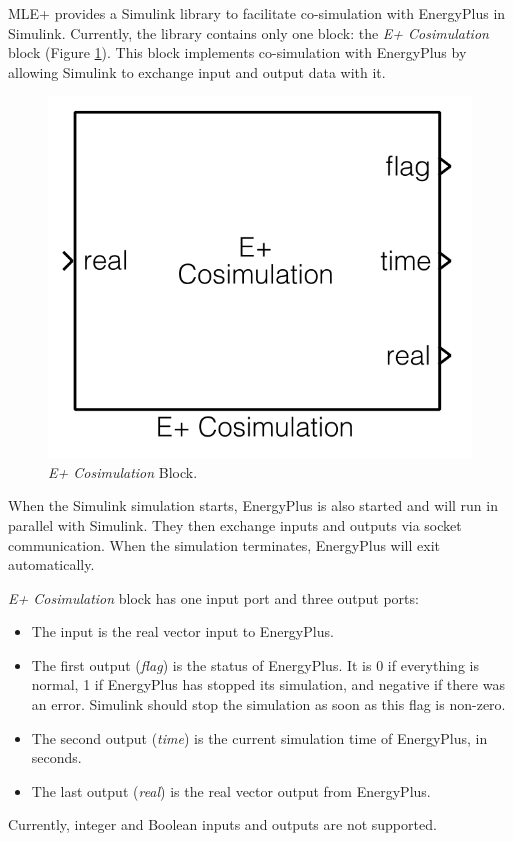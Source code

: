 \documentclass[11pt,letter]{article}
\newcommand{\MLEP}{MLE+\xspace}
\begin{document}
\MLEP provides a Simulink library to facilitate co-simulation with
EnergyPlus in Simulink.  Currently, the library contains only one block:
the \emph{E+ Cosimulation} block (Figure \ref{fig:epblock}).  This
block implements co-simulation with EnergyPlus by allowing Simulink to
exchange input and output data with it.
\begin{figure}[tb]
\centering
\includegraphics[width=.3\linewidth]{graphics/epblock.png}
\caption{\label{fig:epblock}\emph{E+ Cosimulation} Block.}
\end{figure}
When the Simulink simulation starts, EnergyPlus is also started and will run in
parallel with Simulink.  They then exchange inputs and outputs via socket
communication.  When the simulation terminates, EnergyPlus will exit
automatically.

\emph{E+ Cosimulation} block has one input port and three
output ports:
\begin{itemize}
\item The input is the real vector input to EnergyPlus.
\item The first output (\emph{flag}) is the status of EnergyPlus.
It is 0 if everything is normal, 1 if EnergyPlus has stopped its
simulation, and negative if there was an error.  Simulink should
stop the simulation as soon as this flag is non-zero.
\item The second output (\emph{time}) is the current simulation
time of EnergyPlus, in seconds.
\item The last output (\emph{real}) is the real vector output
from EnergyPlus.
\end{itemize}
Currently, integer and Boolean inputs and outputs are not supported.
\end{document}
